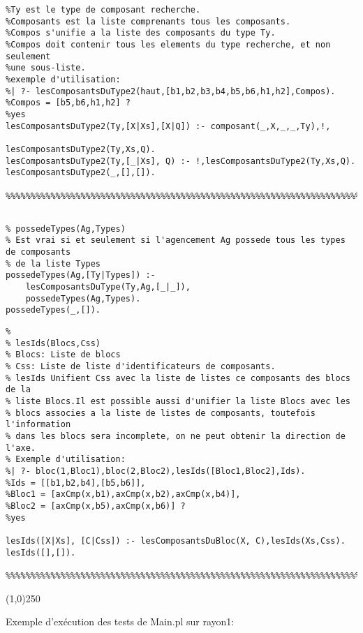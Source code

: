 \documentclass[letterpaper,11pt]{letter}
\begin{document}
\begin{Verbatim}[fontseries=b]
%lesComposantsDuType2(Ty,Composants,Compos).
%Ty est le type de composant recherche.
%Composants est la liste comprenants tous les composants.
%Compos s'unifie a la liste des composants du type Ty.
%Compos doit contenir tous les elements du type recherche, et non seulement
%une sous-liste.
%exemple d'utilisation:
%| ?- lesComposantsDuType2(haut,[b1,b2,b3,b4,b5,b6,h1,h2],Compos).
%Compos = [b5,b6,h1,h2] ? 
%yes
lesComposantsDuType2(Ty,[X|Xs],[X|Q]) :- composant(_,X,_,_,Ty),!,
                                         lesComposantsDuType2(Ty,Xs,Q).
lesComposantsDuType2(Ty,[_|Xs], Q) :- !,lesComposantsDuType2(Ty,Xs,Q).
lesComposantsDuType2(_,[],[]).

%%%%%%%%%%%%%%%%%%%%%%%%%%%%%%%%%%%%%%%%%%%%%%%%%%%%%%%%%%%%%%%%%%%%%%%%%%%%%%%%%
\end{Verbatim}
\begin{Verbatim}

% possedeTypes(Ag,Types)
% Est vrai si et seulement si l'agencement Ag possede tous les types de composants
% de la liste Types
possedeTypes(Ag,[Ty|Types]) :-
	lesComposantsDuType(Ty,Ag,[_|_]),
	possedeTypes(Ag,Types).
possedeTypes(_,[]).

\end{Verbatim}
\begin{Verbatim}[fontseries=b]
%%%%%%%%%%%%%%%%%%%%%%%%%%%%%%%%%%%%%%%%%%%%%%%%%%%%%%%%%%%%%%%%%%%%%%%%%%%%%%%
% 
% lesIds(Blocs,Css)
% Blocs: Liste de blocs
% Css: Liste de liste d'identificateurs de composants.
% lesIds Unifient Css avec la liste de listes ce composants des blocs de la 
% liste Blocs.Il est possible aussi d'unifier la liste Blocs avec les
% blocs associes a la liste de listes de composants, toutefois l'information
% dans les blocs sera incomplete, on ne peut obtenir la direction de l'axe.
% Exemple d'utilisation:
%| ?- bloc(1,Bloc1),bloc(2,Bloc2),lesIds([Bloc1,Bloc2],Ids).
%Ids = [[b1,b2,b4],[b5,b6]],
%Bloc1 = [axCmp(x,b1),axCmp(x,b2),axCmp(x,b4)],
%Bloc2 = [axCmp(x,b5),axCmp(x,b6)] ? 
%yes 

lesIds([X|Xs], [C|Css]) :- lesComposantsDuBloc(X, C),lesIds(Xs,Css).
lesIds([],[]).

%%%%%%%%%%%%%%%%%%%%%%%%%%%%%%%%%%%%%%%%%%%%%%%%%%%%%%%%%%%%%%%%%%%%%%%%%%%%%%%
\end{Verbatim}

\begin{center}
\line(1,0){250}
\end{center}

Exemple d'exécution des tests de Main.pl sur rayon1:
\end{document}
